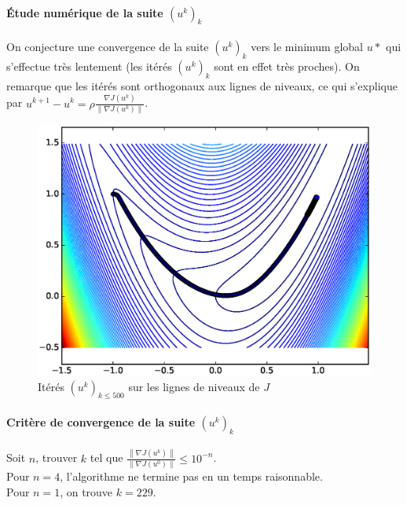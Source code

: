 \documentclass[paper=a4, fontsize=11pt]{article}
\begin{document}
\paragraph{Étude numérique de la suite $(u^k)_k$\\}
On conjecture une convergence de la suite $(u^k)_k$ vers le minimum global $u*$ qui s'effectue très lentement (les itérés $(u^{k})_{k}$ sont en effet très proches). On remarque que les itérés sont orthogonaux aux lignes de niveaux, ce qui s'explique par $u^{k+1}-u^{k} = \rho \frac{\nabla J(u^k)}{\left\|\nabla J(u^k)\right\|}$.\\
\begin{figure}[h]
\begin{center}
\includegraphics[scale=0.6]{suite-u}
 \end{center}
 \caption{\label{étiquette2} Itérés $(u^{k})_{k\leq500}$ sur les lignes de niveaux de $J$}
\end{figure}

\paragraph{Critère de convergence de la suite $(u^k)_k$\\}
Soit $n$, trouver $k$ tel que $\frac{\left\|\nabla J(u^k)\right\|}{\left\|\nabla J(u^0)\right\|} \leq 10^{-n}$.\\
Pour $ n = 4$, l'algorithme ne termine pas en un temps raisonnable. \\
Pour $ n = 1$, on trouve $k = 229$.
\end{document}
